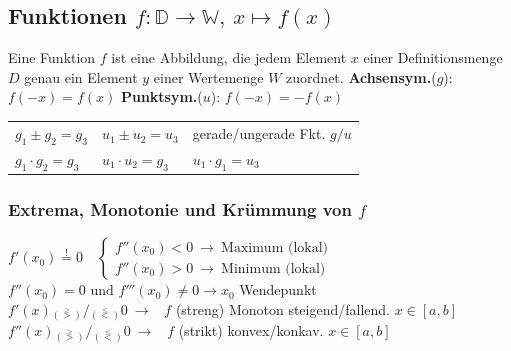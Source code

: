 \documentclass[german]{latex4ei/latex4ei_sheet}
\begin{document}
\begin{sectionbox}
	\subsection{Funktionen $f:\mathbb D \rightarrow \mathbb W,\ x \mapsto f(x)$}
	Eine Funktion $f$ ist eine Abbildung, die jedem Element $x$ einer Definitionsmenge $D$ genau ein Element $y$ einer Wertemenge $W$ zuordnet.
	\textbf{Achsensym.}($g$): $f(-x)=f(x)$ \qquad \textbf{Punktsym.}($u$): $f(-x)=-f(x)$\\
	\begin{tabular}{@{}lll}
	$g_1 \pm g_2 = g_3$ & \quad $u_1 \pm u_2 = u_3$ & \quad gerade/ungerade Fkt. $g/u$\\
	$g_1 \cdot g_2=g_3$ & \quad $u_1 \cdot u_2 = g_3$ & \quad $u_1 \cdot g_1=u_3$
	\end{tabular}

			\subsubsection{Extrema, Monotonie und Krümmung von $f$}
			$f'(x_0)\overset{!}{=}0 \quad \begin{cases}f''(x_0)<0 \ \rightarrow \ \text{Maximum (lokal)} \\ f''(x_0)>0 \ \rightarrow \ \text{Minimum (lokal)}\end{cases} $\\
			$f''(x_0)=0 \text{ und } f'''(x_0) \ne 0 \rightarrow x_0$ Wendepunkt \\
			$f'(x) \stackrel{_\ge}{_{(>)}}\!\! / \!\! \stackrel{_\le}{_{(<)}} 0 \ \rightarrow$ \ $f$ (streng) Monoton steigend/fallend. $x\in[a,b]$\\
			$f''(x) \stackrel{_\ge}{_{(>)}}\!\! / \!\! \stackrel{_\le}{_{(<)}} 0 \ \rightarrow$ \ $f$ (strikt) konvex/konkav. $x\in[a,b]$\\
\end{sectionbox}
\end{document}
